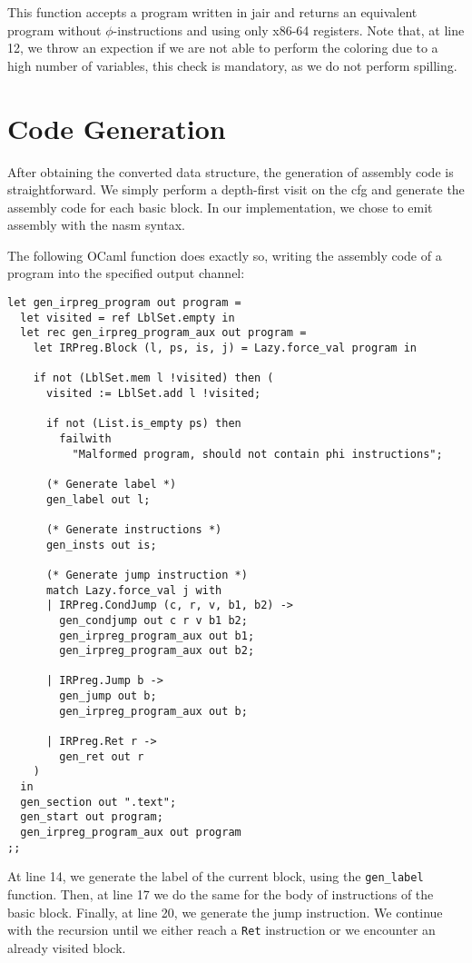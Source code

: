 This function accepts a program written in \gls{jair} and returns an equivalent program without $\phi$-instructions and using only x86-64 registers.
Note that, at line 12, we throw an expection if we are not able to perform the coloring due to a high number of variables, this check is mandatory, as we do not perform spilling.

\section{Code Generation}
\label{sec:codegen}

After obtaining the converted data structure, the generation of assembly code is straightforward. We simply perform a depth-first visit on the \gls{cfg} and generate the assembly code for each basic block.
In our implementation, we chose to emit assembly with the \gls{nasm} syntax.

The following OCaml function does exactly so, writing the assembly code of a program into the specified output channel:

\begin{lstlisting}[style=OCaml]
let gen_irpreg_program out program =
  let visited = ref LblSet.empty in
  let rec gen_irpreg_program_aux out program =
    let IRPreg.Block (l, ps, is, j) = Lazy.force_val program in

    if not (LblSet.mem l !visited) then (
      visited := LblSet.add l !visited;

      if not (List.is_empty ps) then
        failwith
          "Malformed program, should not contain phi instructions";

      (* Generate label *)
      gen_label out l;

      (* Generate instructions *)
      gen_insts out is;

      (* Generate jump instruction *)
      match Lazy.force_val j with
      | IRPreg.CondJump (c, r, v, b1, b2) ->
        gen_condjump out c r v b1 b2;
        gen_irpreg_program_aux out b1;
        gen_irpreg_program_aux out b2;

      | IRPreg.Jump b ->
        gen_jump out b;
        gen_irpreg_program_aux out b;

      | IRPreg.Ret r ->
        gen_ret out r
    )
  in
  gen_section out ".text";
  gen_start out program;
  gen_irpreg_program_aux out program
;;
\end{lstlisting}

At line 14, we generate the label of the current block, using the \texttt{gen\_label} function. Then, at line 17 we do the same for the body of instructions of the basic block. Finally, at line 20, we generate the jump instruction. We continue with the recursion until we either reach a \texttt{Ret} instruction or we encounter an already visited block.

